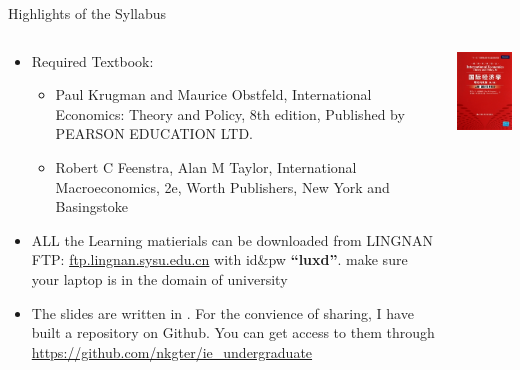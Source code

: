 \documentclass[10pt,hyperref={CJKbookmarks=true},xcolor=dvipsnames,aspectratio=43]{beamer}
\begin{document}
\begin{frame}{Highlights of the Syllabus}


\begin{columns}[onlytextwidth]
\begin{column}{0.55\textwidth}
\begin{itemize}
\item Required Textbook:

\begin{itemize}
\item Paul Krugman and Maurice Obstfeld, International Economics: Theory
and Policy, 8th edition, Published by PEARSON EDUCATION LTD.
\item Robert C Feenstra, Alan M Taylor, International Macroeconomics, 2e,
Worth Publishers, New York and Basingstoke
\end{itemize}

	\item ALL the Learning matierials can be downloaded from LINGNAN FTP:
\url{ftp.lingnan.sysu.edu.cn} with id\&pw \textbf{“luxd”}. make sure your laptop is in the domain
of university
	\item The slides are written in \LaTeXe. For the convience of sharing, I have built a repository on Github. You can get access to them through \url{https://github.com/nkgter/ie_undergraduate}
\end{itemize}

\end{column}
\begin{column}{0.35\textwidth}
\includegraphics[scale=1]{fig//krugman_textbook}
\end{column}
\end{columns}

\end{frame}
\end{document}
